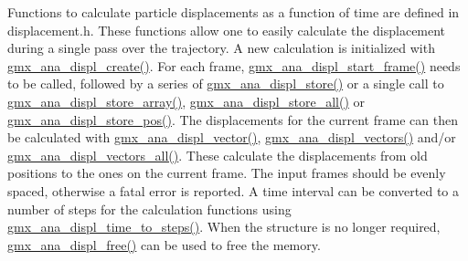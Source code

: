 \-Functions to calculate particle displacements as a function of time are defined in displacement.\-h. \-These functions allow one to easily calculate the displacement during a single pass over the trajectory. \-A new calculation is initialized with \hyperlink{include_2displacement_8h_a246b6e5b5ce780fd88210f0e0f6410eb}{gmx\-\_\-ana\-\_\-displ\-\_\-create()}. \-For each frame, \hyperlink{include_2displacement_8h_a4fbbe00acaff0a0a7b3d4593bf708b96}{gmx\-\_\-ana\-\_\-displ\-\_\-start\-\_\-frame()} needs to be called, followed by a series of \hyperlink{include_2displacement_8h_a1249df9ac34685bd9609e1944bccb14a}{gmx\-\_\-ana\-\_\-displ\-\_\-store()} or a single call to \hyperlink{include_2displacement_8h_a23227f37b703ca5d00cdaa2af678e728}{gmx\-\_\-ana\-\_\-displ\-\_\-store\-\_\-array()}, \hyperlink{include_2displacement_8h_acd4c27a82da37705cbecc5400b5001ad}{gmx\-\_\-ana\-\_\-displ\-\_\-store\-\_\-all()} or \hyperlink{include_2displacement_8h_ab79079085cbe4605fc2c5ea9754a91e5}{gmx\-\_\-ana\-\_\-displ\-\_\-store\-\_\-pos()}. \-The displacements for the current frame can then be calculated with \hyperlink{include_2displacement_8h_ad2b5a136e9e87e0976ae558bff6fa0a9}{gmx\-\_\-ana\-\_\-displ\-\_\-vector()}, \hyperlink{include_2displacement_8h_a07581fadc4db16ad790533b67c7ed7a5}{gmx\-\_\-ana\-\_\-displ\-\_\-vectors()} and/or \hyperlink{include_2displacement_8h_af99ad13734798104a87fbdd44de8627e}{gmx\-\_\-ana\-\_\-displ\-\_\-vectors\-\_\-all()}. \-These calculate the displacements from old positions to the ones on the current frame. \-The input frames should be evenly spaced, otherwise a fatal error is reported. \-A time interval can be converted to a number of steps for the calculation functions using \hyperlink{include_2displacement_8h_a87f1257d1fff4526bfc989d1dbfd177a}{gmx\-\_\-ana\-\_\-displ\-\_\-time\-\_\-to\-\_\-steps()}. \-When the structure is no longer required, \hyperlink{include_2displacement_8h_a1c6c8a635f8e4918789917d790958f77}{gmx\-\_\-ana\-\_\-displ\-\_\-free()} can be used to free the memory.

